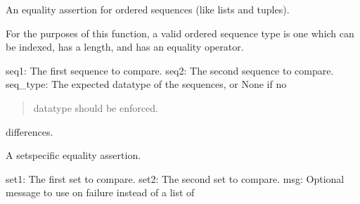 \documentclass[letterpaper,10pt,english]{sphinxmanual}
\begin{document}
\begin{fulllineitems}

\begin{fulllineitems}
\label{\detokenize{_autosummary/tests.test_unit.test_df:tests.test_unit.test_df.assertSequenceEqual}}
\pysigstartsignatures
{}
\pysigstopsignatures
\sphinxAtStartPar
An equality assertion for ordered sequences (like lists and tuples).

\sphinxAtStartPar
For the purposes of this function, a valid ordered sequence type is one
which can be indexed, has a length, and has an equality operator.
\begin{description}
\sphinxAtStartPar
seq1: The first sequence to compare.
seq2: The second sequence to compare.
seq\_type: The expected datatype of the sequences, or None if no
\begin{quote}

\sphinxAtStartPar
datatype should be enforced.
\end{quote}
\begin{description}
\sphinxAtStartPar
differences.

\end{description}

\end{description}

\end{fulllineitems}


\begin{fulllineitems}
\label{\detokenize{_autosummary/tests.test_unit.test_df:tests.test_unit.test_df.assertSetEqual}}
\pysigstartsignatures
{}
\pysigstopsignatures
\sphinxAtStartPar
A set\sphinxhyphen{}specific equality assertion.
\begin{description}
\sphinxAtStartPar
set1: The first set to compare.
set2: The second set to compare.
msg: Optional message to use on failure instead of a list of
\begin{quote}


\end{quote}
\end{description}
\end{fulllineitems}
\end{fulllineitems}
\end{document}
